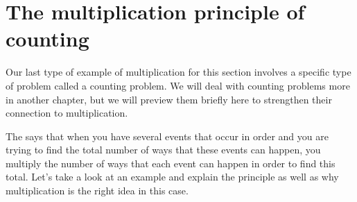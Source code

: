 \documentclass{ximera}
\begin{document}
\section{The multiplication principle of counting}

Our last type of example of multiplication for this section involves a specific type of problem called a counting problem. We will deal with counting problems more in another chapter, but we will preview them briefly here to strengthen their connection to multiplication.

The  says that when you have several events that occur in order and you are trying to find the total number of ways that these events can happen, you multiply the number of ways that each event can happen in order to find this total. Let's take a look at an example and explain the principle as well as why multiplication is the right idea in this case.
\end{document}
